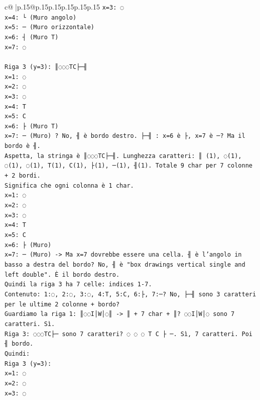 \documentclass{article}
\begin{document}
{\begin{supertabular}{c@{$\;$}|p{.15\linewidth}@{}p{.15\linewidth}p{.15\linewidth}p{.15\linewidth}p{.15\linewidth}p{.15\linewidth}}
{{{\texttt{x=3: ◌} \\
\texttt{x=4: └ (Muro angolo)} \\
\texttt{x=5: ─ (Muro orizzontale)} \\
\texttt{x=6: ┤ (Muro T)} \\
\texttt{x=7: ◌} \\
\\ 
\texttt{Riga 3 (y=3): ║◌◌◌TC├─╢} \\
\texttt{x=1: ◌} \\
\texttt{x=2: ◌} \\
\texttt{x=3: ◌} \\
\texttt{x=4: T} \\
\texttt{x=5: C} \\
\texttt{x=6: ├ (Muro T)} \\
\texttt{x=7: ─ (Muro) ? No, ╢ è bordo destro. ├─╢ : x=6 è ├, x=7 è ─? Ma il bordo è ╢.} \\
\texttt{Aspetta, la stringa è ║◌◌◌TC├─╢. Lunghezza caratteri: ║ (1), ◌(1), ◌(1), ◌(1), T(1), C(1), ├(1), ─(1), ╢(1). Totale 9 char per 7 colonne + 2 bordi.} \\
\texttt{Significa che ogni colonna è 1 char.} \\
\texttt{x=1: ◌} \\
\texttt{x=2: ◌} \\
\texttt{x=3: ◌} \\
\texttt{x=4: T} \\
\texttt{x=5: C} \\
\texttt{x=6: ├ (Muro)} \\
\texttt{x=7: ─ (Muro) {-}> Ma x=7 dovrebbe essere una cella. ╢ è l'angolo in basso a destra del bordo? No, ╢ è "box drawings vertical single and left double". È il bordo destro.} \\
\texttt{Quindi la riga 3 ha 7 celle: indices 1{-}7.} \\
\texttt{Contenuto: 1:◌, 2:◌, 3:◌, 4:T, 5:C, 6:├, 7:─? No, ├─╢ sono 3 caratteri per le ultime 2 colonne + bordo?} \\
\texttt{Guardiamo la riga 1: ║◌◌I│W│◌║ {-}> ║ + 7 char + ║? ◌◌I│W│◌ sono 7 caratteri. Sì.} \\
\texttt{Riga 3: ◌◌◌TC├─ sono 7 caratteri? ◌ ◌ ◌ T C ├ ─. Sì, 7 caratteri. Poi ╢ bordo.} \\
\texttt{Quindi:} \\
\texttt{Riga 3 (y=3):} \\
\texttt{x=1: ◌} \\
\texttt{x=2: ◌} \\
\texttt{x=3: ◌} \\
}}}
\end{supertabular}}
\end{document}
